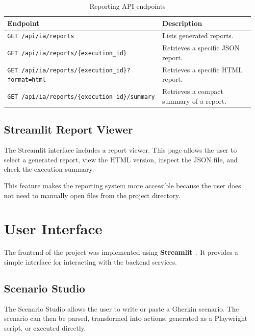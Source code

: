 \begin{table}[H]
	\centering
	\caption{Reporting API endpoints}
	\label{tab:reporting_endpoints}
	\renewcommand{\arraystretch}{1.35}
	\small
	\begin{tabularx}{\textwidth}{|l|X|}
		\hline
		\rowcolor{gray!20}
		\textbf{Endpoint} & \textbf{Description} \\ \hline
		\texttt{GET /api/ia/reports} & Lists generated reports. \\ \hline
		\texttt{GET /api/ia/reports/\{execution\_id\}} & Retrieves a specific JSON report. \\ \hline
		\texttt{GET /api/ia/reports/\{execution\_id\}?format=html} & Retrieves a specific HTML report. \\ \hline
		\texttt{GET /api/ia/reports/\{execution\_id\}/summary} & Retrieves a compact summary of a report. \\ \hline
	\end{tabularx}
\end{table}

\subsection{Streamlit Report Viewer}
\label{subsec:streamlit_report_viewer}

The Streamlit interface includes a report viewer. This page allows the user to select a generated report, view the HTML version, inspect the JSON file, and check the execution summary.

This feature makes the reporting system more accessible because the user does not need to manually open files from the project directory.

\section{User Interface}
\label{sec:user_interface}

The frontend of the project was implemented using \textbf{Streamlit}~\cite{streamlit_docs}. It provides a simple interface for interacting with the backend services.

\subsection{Scenario Studio}
\label{subsec:scenario_studio}

The Scenario Studio allows the user to write or paste a Gherkin scenario. The scenario can then be parsed, transformed into actions, generated as a Playwright script, or executed directly.

